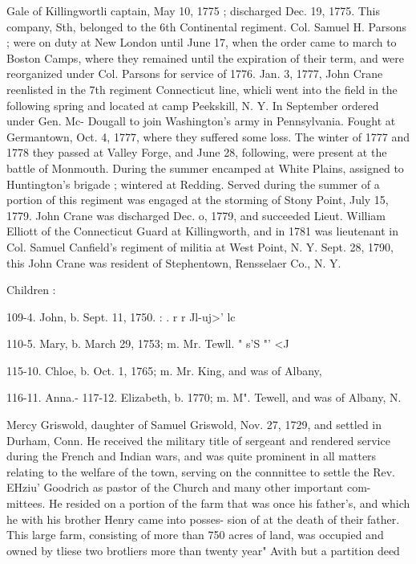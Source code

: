\documentclass{book}
\begin{document}
Gale of Killingwortli captain, May 10, 1775 ; discharged Dec. 
19, 1775. This company, Sth, belonged to the 6th Continental 
regiment. Col. Samuel H. Parsons ; were on duty at New London 
until June 17, when the order came to march to Boston Camps, 
where they remained until the expiration of their term, and were 
reorganized under Col. Parsons for service of 1776. Jan. 3, 
1777, John Crane reenlisted in the 7th regiment Connecticut line, 
whicli went into the field in the following spring and located at 
camp Peekskill, N. Y. In September ordered under Gen. Mc- 
Dougall to join Washington's army in Pennsylvania. Fought at 
Germantown, Oct. 4, 1777, where they suffered some loss. The 
winter of 1777 and 1778 they passed at Valley Forge, and June 
28, following, were present at the battle of Monmouth. During 
the summer encamped at White Plains, assigned to Huntington's 
brigade ; wintered at Redding. Served during the summer of 
a portion of this regiment was engaged at the storming of Stony 
Point, July 15, 1779. John Crane was discharged Dec. o, 1779, 
and succeeded Lieut. William Elliott of the Connecticut Guard at 
Killingworth, and in 1781 was lieutenant in Col. Samuel Canfield's 
regiment of militia at West Point, N. Y. Sept. 28, 1790, this 
John Crane was resident of Stephentown, Rensselaer Co., N. Y. 

Children : 




109-4. John, b. Sept. 11, 1750. : . r r Jl-uj>' lc 

110-5. Mary, b. March 29, 1753; m. Mr. Tewll. " s'S "' <J 




115-10. Chloe, b. Oct. 1, 1765; m. Mr. King, and was of Albany, 

116-11. Anna.- 
117-12. Elizabeth, b. 1770; m. M". Tewell, and was of Albany, N. 


Mercy Griswold, daughter of Samuel Griswold, Nov. 27, 1729, 
and settled in Durham, Conn. He received the military title of 
sergeant and rendered service during the French and Indian wars, 
and was quite prominent in all matters relating to the welfare of 
the town, serving on the connnittee to settle the Rev. EHziu' 
Goodrich as pastor of the Church and many other important com- 
mittees. He resided on a portion of the farm that was once his 
father's, and which he with his brother Henry came into posses- 
sion of at the death of their father. This large farm, consisting 
of more than 750 acres of land, was occupied and owned by tliese 
two brotliers more than twenty year" Avith but a partition deed 
\end{document}

